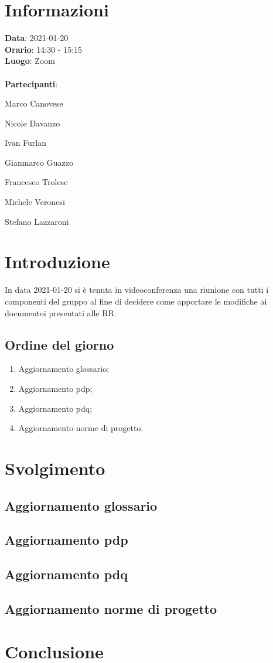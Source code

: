 \section{Informazioni}
\textbf{Data}: 2021-01-20\\
\textbf{Orario}: 14:30 - 15:15\\
\textbf{Luogo}: Zoom\\\\
\textbf{Partecipanti}:\begin{list}{*}{\setlength{\itemsep}{0cm}}
	\item Marco Canovese
	\item Nicole Davanzo
	\item Ivan Furlan
	\item Gianmarco Guazzo
	\item Francesco Trolese
	\item Michele Veronesi
	\item Stefano Lazzaroni
\end{list}

\section{Introduzione}
In data 2021-01-20 si è tenuta in videoconferenza una riunione con tutti i componenti del gruppo al fine di decidere come apportare le modifiche ai documentoi presentati alle RR.

\subsection{Ordine del giorno}
\begin{enumerate}
    \item Aggiornamento glossario;
    \item Aggiornamento pdp;
    \item Aggiornamento pdq;
    \item Aggiornamento norme di progetto.
\end{enumerate}

\section{Svolgimento}
\subsection{Aggiornamento glossario}

\subsection{Aggiornamento pdp}

\subsection{Aggiornamento pdq}

\subsection{Aggiornamento norme di progetto}


\section{Conclusione}


